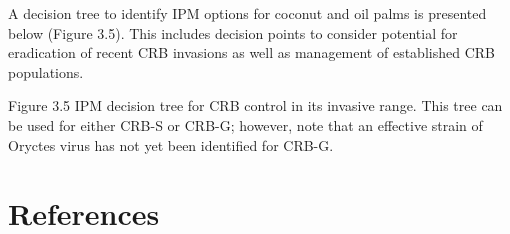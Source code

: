 \documentclass[twocolumn,letterpaper]{scrartcl}
\begin{document}
A decision tree to identify IPM options for coconut and oil palms is presented below (Figure 3.5). This includes 
decision  points  to  consider  potential  for  eradication  of  recent  CRB  invasions  as  well  as  management  of 
established CRB populations. 

Figure 3.5   IPM decision tree for CRB control in its invasive range. This tree can be used for either CRB-S  
or CRB-G; however, note that an effective strain of Oryctes virus has not yet been identified for CRB-G. 

\section{References}
%
%
%
%
%
%
%
%
%
%
%
%
%
%
\end{document}
